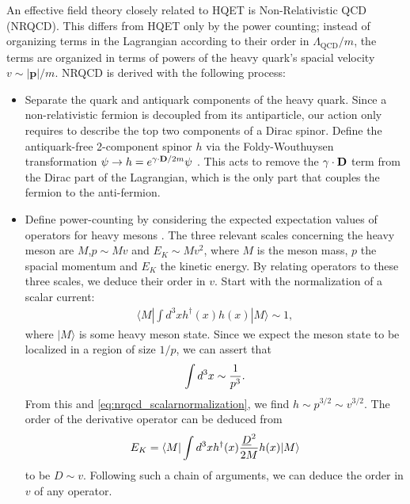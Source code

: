 An effective field theory closely related to HQET is Non-Relativistic QCD (NRQCD). This differs from HQET only by the power counting; instead of organizing terms in the Lagrangian according to their order in $\Lambda_{\text{QCD}}/m$, the terms are organized in terms of powers of the heavy quark's spacial velocity $v \sim |{\textbf{p}}|/m$. NRQCD is derived with the following process:
\begin{itemize}
\item
  Separate the quark and antiquark components of the heavy quark. Since a non-relativistic fermion is decoupled from its antiparticle, our action only requires to describe the top two components of a Dirac spinor.
  Define the antiquark-free 2-component spinor $h$ via the Foldy-Wouthuysen transformation $\psi \to h = e^{ {\bf{\gamma}}\cdot {\bf{D}}/2m} \psi$ \cite{PhysRev.78.29}. This acts to remove the ${\bf{\gamma}}\cdot {\bf{D}}$ term from the Dirac part of the Lagrangian, which is the only part that couples the fermion to the anti-fermion.
\item
  Define power-counting by considering the expected expectation values of operators for heavy mesons \cite{Lepage:1992tx}. The three relevant scales concerning the heavy meson are $M$,$p\sim Mv$ and $E_K\sim Mv^2$, where $M$ is the meson mass, $p$ the spacial momentum and $E_K$ the kinetic energy. By relating operators to these three scales, we deduce their order in $v$. Start with the normalization of a scalar current:
  \begin{align}
    \langle M | \int d^3x h^{\dagger}(x) h(x) | M \rangle \sim 1,
    \label{eq:nrqcd_scalarnormalization}
  \end{align}
  where $| M \rangle$ is some heavy meson state. Since we expect the meson state to be localized in a region of size $1/p$, we can assert that
  \begin{align}
    \int d^3x \sim {1\over p^3}.
  \end{align}
  From this and \eqref{eq:nrqcd_scalarnormalization}, we find $h \sim p^{3/2} \sim v^{3/2}$.
  The order of the derivative operator can be deduced from
  \begin{align}
    E_K = \langle M | \int d^3x h^{\dagger}(x) {\underline{D}^2\over 2M} h(x) | M \rangle
  \end{align}
  to be $D \sim v$. Following such a chain of arguments, we can deduce the order in $v$ of any operator.


\end{itemize}
